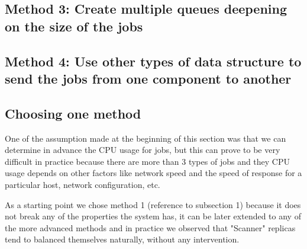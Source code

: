 \subsection{Method 3: Create multiple queues deepening on the size of the jobs}

\subsection{Method 4: Use other types of data structure to send the jobs from one component to another}


\subsection{Choosing one method}
One of the assumption made at the beginning of this section was that we can determine in advance the CPU usage for jobs, but this can prove to be very difficult in practice because there are more than 3 types of jobs and they CPU usage depends on other factors like network speed and the speed of response for a particular host, network configuration, etc.

As a starting point we chose method 1 (reference to subsection 1) because it does not break any of the properties the system has, it can be later extended to any of the more advanced methods and in practice we observed that "Scanner" replicas tend to balanced themselves naturally, without any intervention.